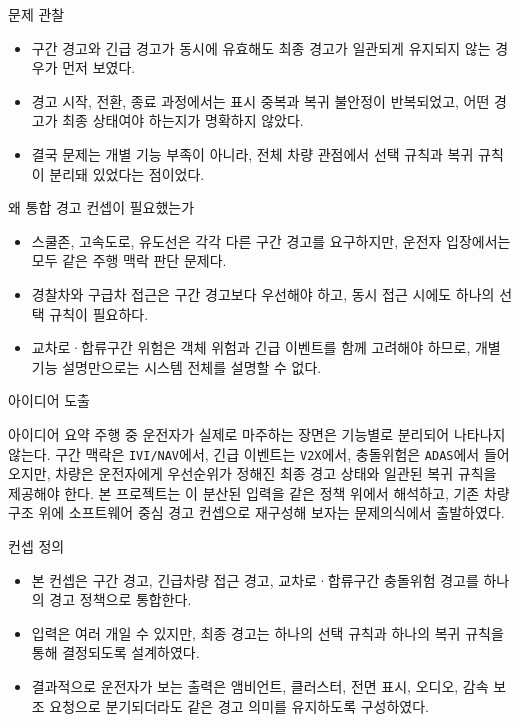 \documentclass[aspectratio=169,10pt]{beamer}
\begin{document}
\begin{frame}{문제 관찰}
\begin{itemize}
  \item 구간 경고와 긴급 경고가 동시에 유효해도 최종 경고가 일관되게 유지되지 않는 경우가 먼저 보였다.
  \item 경고 시작, 전환, 종료 과정에서는 표시 중복과 복귀 불안정이 반복되었고, 어떤 경고가 최종 상태여야 하는지가 명확하지 않았다.
  \item 결국 문제는 개별 기능 부족이 아니라, 전체 차량 관점에서 선택 규칙과 복귀 규칙이 분리돼 있었다는 점이었다.
\end{itemize}
\end{frame}

\begin{frame}{왜 통합 경고 컨셉이 필요했는가}
\begin{itemize}
  \item 스쿨존, 고속도로, 유도선은 각각 다른 구간 경고를 요구하지만, 운전자 입장에서는 모두 같은 주행 맥락 판단 문제다.
  \item 경찰차와 구급차 접근은 구간 경고보다 우선해야 하고, 동시 접근 시에도 하나의 선택 규칙이 필요하다.
  \item 교차로·합류구간 위험은 객체 위험과 긴급 이벤트를 함께 고려해야 하므로, 개별 기능 설명만으로는 시스템 전체를 설명할 수 없다.
\end{itemize}
\end{frame}

\begin{frame}{아이디어 도출}
\begin{block}{아이디어 요약}
\small
주행 중 운전자가 실제로 마주하는 장면은 기능별로 분리되어 나타나지 않는다. 구간 맥락은 \texttt{IVI/NAV}에서, 긴급 이벤트는 \texttt{V2X}에서, 충돌위험은 \texttt{ADAS}에서 들어오지만, 차량은 운전자에게 우선순위가 정해진 최종 경고 상태와 일관된 복귀 규칙을 제공해야 한다. 본 프로젝트는 이 분산된 입력을 같은 정책 위에서 해석하고, 기존 차량 구조 위에 소프트웨어 중심 경고 컨셉으로 재구성해 보자는 문제의식에서 출발하였다.
\end{block}
\end{frame}

\begin{frame}{컨셉 정의}
\begin{itemize}
  \item 본 컨셉은 구간 경고, 긴급차량 접근 경고, 교차로·합류구간 충돌위험 경고를 하나의 경고 정책으로 통합한다.
  \item 입력은 여러 개일 수 있지만, 최종 경고는 하나의 선택 규칙과 하나의 복귀 규칙을 통해 결정되도록 설계하였다.
  \item 결과적으로 운전자가 보는 출력은 앰비언트, 클러스터, 전면 표시, 오디오, 감속 보조 요청으로 분기되더라도 같은 경고 의미를 유지하도록 구성하였다.
\end{itemize}
\end{frame}
\end{document}
